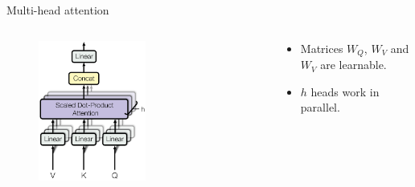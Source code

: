 \documentclass[xcolor=pdftex,dvipsnames,table,mathserif]{beamer}
\begin{document}
\begin{frame}{Multi-head attention}


\begin{columns}
  \begin{column}{.5\textwidth}
  \begin{figure}[ht]
    \centering
    \includegraphics[width=0.55\textwidth]{multi_head_attention}
  \end{figure}

  \end{column}

  \begin{column}{.5\textwidth}
  \begin{itemize}
  \item Matrices $W_Q$, $W_V$ and $W_V$ are learnable.
  \item $h$ heads work in parallel.
  \end{itemize}

  \end{column}
\end{columns}



\end{frame}
\end{document}
